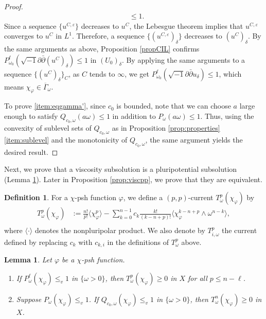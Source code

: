 \documentclass{amsart}
\numberwithin{equation}{section}
\theoremstyle{plain}
\newtheorem{lem}[equation]{Lemma}
\theoremstyle{definition}
\newtheorem{defn}[equation]{Definition}
\theoremstyle{remark}
\newcommand{\delb}{\sqrt{-1}\partial\bar{\partial}}
\begin{document}
\begin{proof}
\begin{equation}
\begin{aligned}
        &\le 1.
        \end{aligned}
        \end{equation}
        Since a sequence $\{u^{C,\varepsilon}\}$ decreases to $u^C$, the Lebesgue theorem implies that $u^{C,\varepsilon}$ converges to $u^C$ in $L^1$. Therefore, a sequence $\{(u^{C,\varepsilon})_\delta\}$ decreases to $(u^C)_\delta$. By the same arguments as above, Proposition \ref{propCIL} confirms $P^\ell_{\omega_0}(\delb(u^C)_\delta) \le 1$ in $(U_0)_\delta$. By applying the same arguments to a sequence $\{(u^C)_\delta\}_C$, as $C$ tends to $\infty$, we get $P^\ell_{\omega_0}(\delb u_\delta)\le 1$, which means $\chi_\varphi\in \overline{\Gamma}_\omega$.

        To prove \ref{item:eqgamma'}, since $c_0$ is bounded, note that we can choose $a$ large enough to satisfy $Q_{c_0,\omega}(a\omega)\le1$ in addition to $P_\omega(a\omega)\le1$. Thus, using the convexity of sublevel sets of $Q_{c_0,\omega}$ as in Proposition \ref{prop:properties} \ref{item:sublevel} and the monotonicity of $Q_{c_0,\omega}$, the same argument yields the desired result.
    \end{proof}

Next, we prove that a viscosity subsolution is a pluripotential subsolution (Lemma \ref{lem:visctopp}). Later in Proposition \ref{prop:viscpp}, we prove that they are equivalent.

\begin{defn}\label{def:llcurrent}
    For a $\chi$-psh function $\varphi$, we define a $(p,p)$-current $T^p_\omega(\chi_\varphi)$ by
    \begin{align*}
        T^p_\omega(\chi_\varphi)&:=\frac{n!}{p!}\langle\chi_\varphi^p\rangle-\sum_{k=0}^{n-1}c_k\frac{k!}{(k-n+p)!}\langle\chi_\varphi^{k-n+p}\wedge\omega^{n-k}\rangle,\\
    \end{align*}
    where $\langle\cdot\rangle$ denotes the nonpluripolar product.
    We also denote by $T^p_{i,\omega}$ the current defined by replacing $c_k$ with $c_{k,i}$ in the definitions of $T^p_\omega$ above.
\end{defn}

\begin{lem}\label{lem:visctopp}
    Let $\varphi$ be a $\chi$-psh function.
    \begin{enumerate}[label={\upshape(\roman*)}]
        \item\label{item:visctoppn-1} 
        If $P^\ell_{\omega}(\chi_\varphi)\le_v 1$ in $\{\omega>0\}$, then $T^p_\omega(\chi_\varphi)\ge0$ in $X$ for all $p\le n-\ell$.
        \item\label{item:visctoppn} 
        Suppose $P_{\omega}(\chi_\varphi)\le_v 1$. If $Q_{c_0,\omega}(\chi_\varphi)\le_v 1$ in $\{\omega>0\}$, then $T^n_\omega(\chi_\varphi)\ge0$ in $X$.
    \end{enumerate}
\end{lem}
\end{document}
